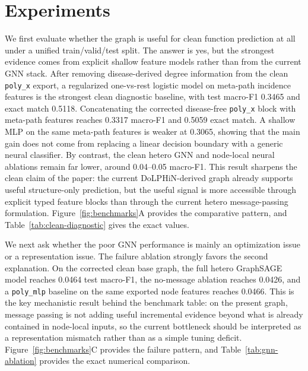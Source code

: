 \documentclass[11pt]{article}
\begin{document}
\section{Experiments}
\label{sec:experiments}

We first evaluate whether the graph is useful for clean function prediction at all under a unified train/valid/test split. The answer is yes, but the strongest evidence comes from explicit shallow feature models rather than from the current GNN stack. After removing disease-derived degree information from the clean \texttt{poly\_x} export, a regularized one-vs-rest logistic model on meta-path incidence features is the strongest clean diagnostic baseline, with test macro-F1 0.3465 and exact match 0.5118. Concatenating the corrected disease-free \texttt{poly\_x} block with meta-path features reaches 0.3317 macro-F1 and 0.5059 exact match. A shallow MLP on the same meta-path features is weaker at 0.3065, showing that the main gain does not come from replacing a linear decision boundary with a generic neural classifier. By contrast, the clean hetero GNN and node-local neural ablations remain far lower, around 0.04--0.05 macro-F1. This result sharpens the clean claim of the paper: the current DoLPHiN-derived graph already supports useful structure-only prediction, but the useful signal is more accessible through explicit typed feature blocks than through the current hetero message-passing formulation. Figure~\ref{fig:benchmarks}A provides the comparative pattern, and Table~\ref{tab:clean-diagnostic} gives the exact values.

We next ask whether the poor GNN performance is mainly an optimization issue or a representation issue. The failure ablation strongly favors the second explanation. On the corrected clean base graph, the full hetero GraphSAGE model reaches 0.0464 test macro-F1, the no-message ablation reaches 0.0426, and a \texttt{poly\_mlp} baseline on the same exported node features reaches 0.0466. This is the key mechanistic result behind the benchmark table: on the present graph, message passing is not adding useful incremental evidence beyond what is already contained in node-local inputs, so the current bottleneck should be interpreted as a representation mismatch rather than as a simple tuning deficit. Figure~\ref{fig:benchmarks}C provides the failure pattern, and Table~\ref{tab:gnn-ablation} provides the exact numerical comparison.
\end{document}
